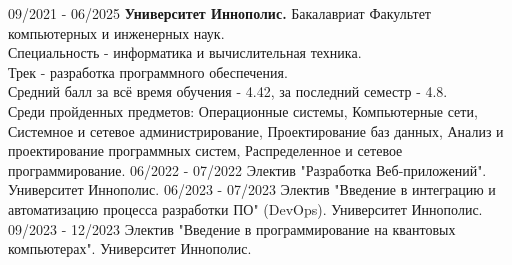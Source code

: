 \documentclass[9pt]{developercv} %
\begin{document}
\vspace{-10 pt}
\begin{entrylist}
    \entry
		{09/2021 - 06/2025}
		{{\textbf{Университет Иннополис.}}}
		{Бакалавриат}
		{Факультет компьютерных и инженерных наук. \\
            Специальность - информатика и вычислительная техника. \\
            Трек - разработка программного обеспечения. \\
            Средний балл за всё время обучения - 4.42, за последний семестр - 4.8. \\
            Среди пройденных предметов: Операционные системы, Компьютерные сети, Системное и сетевое администрирование, Проектирование баз данных, Анализ и проектирование программных систем, Распределенное и сетевое программирование.}
    \entry
		{06/2022 - 07/2022}
		{Электив "Разработка Веб-приложений". {Университет Иннополис.}}
            {}
		{}
    \entry
		{06/2023 - 07/2023}
		{Электив "Введение в интеграцию и автоматизацию процесса разработки ПО" (DevOps). {Университет Иннополис.}}
		  {}
		{}
    \entry
		{09/2023 - 12/2023}
		{Электив "Введение в программирование на квантовых компьютерах". {Университет Иннополис.}}
            {}
		{}
		 
\end{entrylist}
\end{document}
